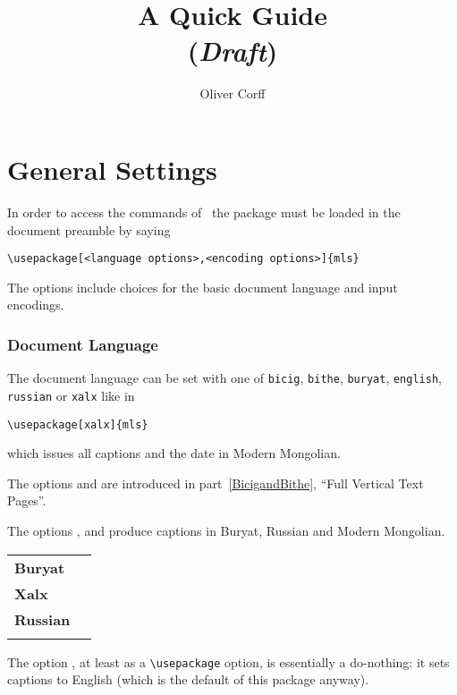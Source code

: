 \documentclass[11pt,a4paper]{article}
\begin{document}
\title{\MonTeX\\A Quick Guide\\(\emph{Draft})}
\author{Oliver Corff}
\maketitle
\tableofcontents
\section{General Settings}
In order to access the commands of \MonTeX\ the package must be
loaded in the document preamble by saying

\begin{verbatim}
\usepackage[<language options>,<encoding options>]{mls}
\end{verbatim}

The options include choices for the basic document language and
input encodings.

\subsubsection{Document Language}

The document language can be set with one of
	\verb"bicig",
	\verb"bithe",
	\verb"buryat",
	\verb"english",
	\verb"russian" or
	\verb"xalx"
like in
\begin{verbatim}
\usepackage[xalx]{mls}
\end{verbatim}
which issues all captions and the date in Modern Mongolian.

The options  and  are introduced 
in part~\ref{BicigandBithe}, ``Full Vertical Text Pages''.

The options ,  and 
	produce captions in Buryat, Russian and Modern Mongolian.

\begin{center}
	\begin{tabular}{ll}
	    \textbf{Buryat}	&\BuryatToday\\\label{BuryatToday}
	    \textbf{Xalx}	&\XalxToday\\\label{XalxToday}
	    \textbf{Russian}	&\RussianToday\\\label{RussianToday}
	\end{tabular}
\end{center}


The option
, at least as a \verb"\usepackage" option, is
essentially a do-nothing: it sets captions to English (which is
the default of this package anyway).
\end{document}
